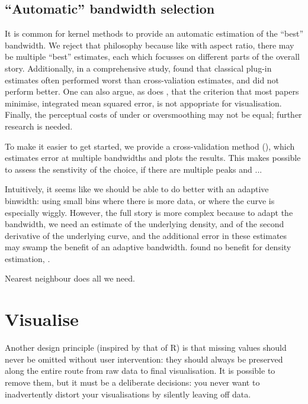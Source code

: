 \documentclass[journal]{vgtc}                %
\begin{document}
\subsection{``Automatic'' bandwidth selection}

It is common for kernel methods to provide an automatic estimation of the ``best'' bandwidth. We reject that philosophy because like with aspect ratio, there may be multiple ``best'' estimates, each which focusses on different parts of the overall story. Additionally, in a comprehensive study, \cite{loader:1999} found that classical plug-in estimates often performed worst than cross-valiation estimates, and did not perform better. One can also argue, as does \citep{denby:2009}, that the criterion that most papers minimise, integrated mean squared error, is not appopriate for visualisation. Finally, the perceptual costs of under or oversmoothing may not be equal; further research is needed.

To make it easier to get started, we provide a cross-validation method (\citep{efron:1983}), which estimates error at multiple bandwidths and plots the results.  This makes possible to assess the senstivity of the choice, if there are multiple peaks and ...

Intuitively, it seems like we should be able to do better with an adaptive binwidth: using small bins where there is more data, or where the curve is especially wiggly. However, the full story is more complex because to adapt the bandwidth, we need an estimate of the underlying density, and of the second derivative of the underlying curve, and the additional error in these estimates may swamp the benefit of an adaptive bandwidth. \cite{terrell:1992} found no benefit for density estimation, \citep{fan:1992,brockmann:1993,schucany:1995,herrmann:1997}.

\citep{abramson:1982}

Nearest neighbour does all we need. 



\section{Visualise}
\label{sec:visualise}

Another design principle (inspired by that of R) is that missing values should never be omitted without user intervention: they should always be preserved along the entire route from raw data to final visualisation. It is possible to remove them, but it must be a deliberate decisions: you never want to inadvertently distort your visualisations by silently leaving off data.
\end{document}
